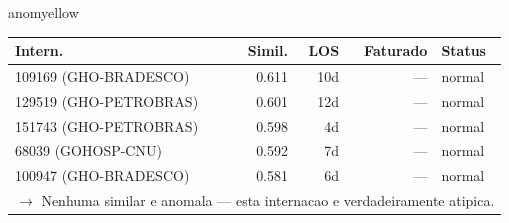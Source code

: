 \documentclass[a4paper,10pt]{article}
\begin{document}
\begin{anomalycard}[Internacao 59189 | GHO-PETROBRAS | MODERADO (z=2.10)]{anomyellow}
\begin{tabular}{l r r r l}\toprule\textbf{Intern.} & \textbf{Simil.} & \textbf{LOS} & \textbf{Faturado} & \textbf{Status} \\\midrule
109169 (GHO-BRADESCO) & 0.611 & 10d & --- & \textcolor{jcubeblue}{normal} \\
129519 (GHO-PETROBRAS) & 0.601 & 12d & --- & \textcolor{jcubeblue}{normal} \\
151743 (GHO-PETROBRAS) & 0.598 & 4d & --- & \textcolor{jcubeblue}{normal} \\
68039 (GOHOSP-CNU) & 0.592 & 7d & --- & \textcolor{jcubeblue}{normal} \\
100947 (GHO-BRADESCO) & 0.581 & 6d & --- & \textcolor{jcubeblue}{normal} \\
\multicolumn{5}{l}{\textcolor{jcubeblue}{\small $\rightarrow$ Nenhuma similar e anomala --- esta internacao e verdadeiramente atipica.}} \\
\bottomrule\end{tabular}


\end{anomalycard}

\newpage
\end{document}
